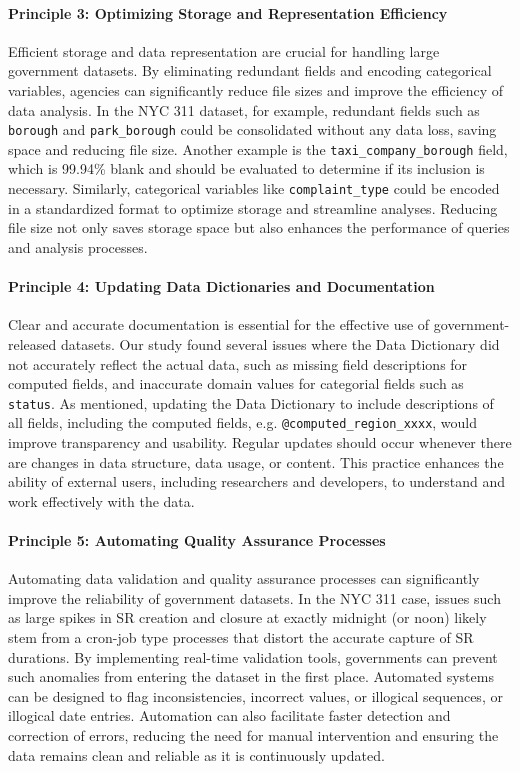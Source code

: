 \documentclass[linenumber]{jdsart}
\begin{document}
\paragraph{Principle 3: Optimizing Storage and Representation Efficiency}
Efficient storage and data representation are crucial for handling 
large government datasets. By eliminating redundant fields and 
encoding categorical variables, agencies can significantly reduce 
file sizes and improve the efficiency of data analysis. In the NYC 
311 dataset, for example, redundant fields such as \texttt{borough} 
and \texttt{park\_borough} could be consolidated without any data 
loss, saving space and reducing file size. Another 
example is the \texttt{taxi\_company\_borough} field, which is 99.94\% 
blank and should be evaluated to determine if its inclusion is 
necessary. Similarly, categorical variables like \texttt{complaint\_type} 
could be encoded in a standardized format to optimize storage and 
streamline analyses. Reducing file size not only saves storage space 
but also enhances the performance of queries and analysis processes.

\paragraph{Principle 4: Updating Data Dictionaries and Documentation}
Clear and accurate documentation is essential for the effective use 
of government-released datasets. Our study found several 
issues where the Data Dictionary did not accurately reflect the 
actual data, such as missing field descriptions for computed fields, and 
inaccurate domain values for categorial fields such as \texttt{status}. 
As mentioned, updating the Data Dictionary to include descriptions of all fields, 
including the computed fields, e.g. \texttt{@computed\_region\_xxxx}, 
would improve transparency and usability. Regular updates should 
occur whenever there are changes in data structure, data usage, or 
content. This practice enhances the ability of external users, 
including researchers and developers, to understand and work 
effectively with the data.

\paragraph{Principle 5: Automating Quality Assurance Processes}
Automating data validation and quality assurance processes can 
significantly improve the reliability of government datasets. In the 
NYC 311 case, issues such as large spikes in SR creation and closure 
at exactly midnight (or noon) likely stem from a cron-job type 
processes that distort the accurate capture of SR 
durations. By implementing real-time validation tools, governments 
can prevent such anomalies from entering the dataset in the first 
place. Automated 
systems can be designed to flag inconsistencies, incorrect values, 
or illogical sequences, or illogical date entries. 
Automation can also facilitate faster detection and correction of 
errors, reducing the need for manual intervention and ensuring 
the data remains clean and reliable as it is continuously updated.
\end{document}
